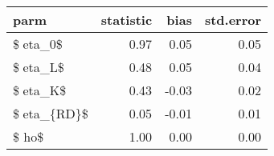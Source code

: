 \begin{tabular}{lrrr}
  \hline
parm & statistic & bias & std.error \\ 
  \hline
\$eta\_0\$ & 0.97 & 0.05 & 0.05 \\ 
  \$eta\_L\$ & 0.48 & 0.05 & 0.04 \\ 
  \$eta\_K\$ & 0.43 & -0.03 & 0.02 \\ 
  \$eta\_\{RD\}\$ & 0.05 & -0.01 & 0.01 \\ 
  \$
ho\$ & 1.00 & 0.00 & 0.00 \\ 
   \hline
\end{tabular}
